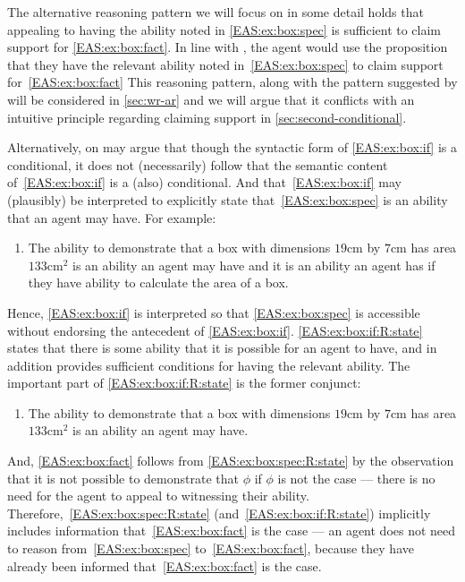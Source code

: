 \begin{note}[Alternatives]
  The alternative reasoning pattern we will focus on in some detail holds that appealing to having the ability noted in \ref{EAS:ex:box:spec} is sufficient to claim support for \ref{EAS:ex:box:fact}.
  In line with \ESU{}, the agent would use the proposition that they have the relevant ability noted in~\ref{EAS:ex:box:spec} to claim support for~\ref{EAS:ex:box:fact}
  This reasoning pattern, along with the pattern suggested by \EAS{} will be considered in \autoref{sec:wr-ar} and we will argue that it conflicts with an intuitive principle regarding claiming support in \ref{sec:second-conditional}.

  Alternatively, on may argue that though the syntactic form of \ref{EAS:ex:box:if} is a conditional, it does not (necessarily) follow that the semantic content of~\ref{EAS:ex:box:if} is a (also) conditional.
  And that~\ref{EAS:ex:box:if} may (plausibly) be interpreted to explicitly state that~\ref{EAS:ex:box:spec} is an ability that an agent may have.
  For example:
  \begin{enumerate}[label=\emph{A}\arabic*., ref=(\emph{A}\arabic*), resume*=EAS_counter]
  \item\label{EAS:ex:box:if:R:state} The ability to demonstrate that a box with dimensions \(19\text{cm}\) by \(7\text{cm}\) has area \(133\text{cm}^{2}\) is an ability an agent may have and it is an ability an agent has if they have ability to calculate the area of a box.
  \end{enumerate}
  Hence, \ref{EAS:ex:box:if} is interpreted so that \ref{EAS:ex:box:spec} is accessible without endorsing the antecedent of \ref{EAS:ex:box:if}.
  \ref{EAS:ex:box:if:R:state} states that there is some ability that it is possible for an agent to have, and in addition provides sufficient conditions for having the relevant ability.
  The important part of \ref{EAS:ex:box:if:R:state} is the former conjunct:
  \begin{enumerate}[label=\emph{A}\arabic*., ref=(\emph{A}\arabic*), resume*=EAS_counter]
  \item\label{EAS:ex:box:spec:R:state} The ability to demonstrate that a box with dimensions \(19\text{cm}\) by \(7\text{cm}\) has area \(133\text{cm}^{2}\) is an ability an agent may have.
  \end{enumerate}
  And, \ref{EAS:ex:box:fact} follows from \ref{EAS:ex:box:spec:R:state} by the observation that it is not possible to demonstrate that \(\phi\) if \(\phi\) is not the case --- there is no need for the agent to appeal to witnessing their ability.
  Therefore,~\ref{EAS:ex:box:spec:R:state} (and~\ref{EAS:ex:box:if:R:state}) implicitly includes information that~\ref{EAS:ex:box:fact} is the case --- an agent does not need to reason from~\ref{EAS:ex:box:spec} to~\ref{EAS:ex:box:fact}, because they have already been informed that~\ref{EAS:ex:box:fact} is the case.


\end{note}
